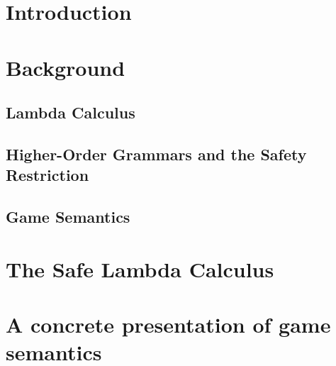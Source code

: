 \begin{romanpages}
\tableofcontents
\listoffigures
\listoftables
\end{romanpages}

\listoftodos
\bigskip

%

\chapter{Introduction}




\chapter{Background}
\label{chap:background}
    \section{Lambda Calculus}
    

    \section{Higher-Order Grammars and the Safety Restriction}
    

    

    \section{Game Semantics}
    

\chapter{The Safe Lambda Calculus}
\label{chap:safelambda}
    
    
    
    
    
    


\chapter{A concrete presentation of game semantics}
    \label{chap:concrete_gamesem}
    

